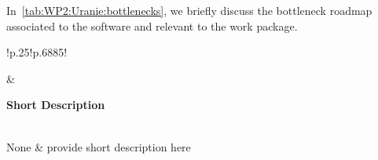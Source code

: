 In~\cref{tab:WP2:Uranie:bottlenecks}, we briefly discuss the bottleneck roadmap associated to the software and relevant to the work package.

\begin{table}[h!]
    \centering
    
    

    \centering
    { 
        \setlength{\parindent}{0pt}
        \def\arraystretch{1.25}
        {
            \fontsize{9}{11}\selectfont
            \begin{tabular}{!{\color{numpexgray}\vrule}p{.25\linewidth}!{\color{numpexgray}\vrule}p{.6885\linewidth}!{\color{numpexgray}\vrule}}
    
     &  {\rule{0pt}{2.5ex}\color{white}\bf Short Description }\\ 
    
    None & provide short description here \\
\end{tabular}
        }
    }
    \caption{WP2: Uranie plan with Respect to Relevant Bottlenecks}
    \label{tab:WP2:Uranie:bottlenecks}
\end{table}